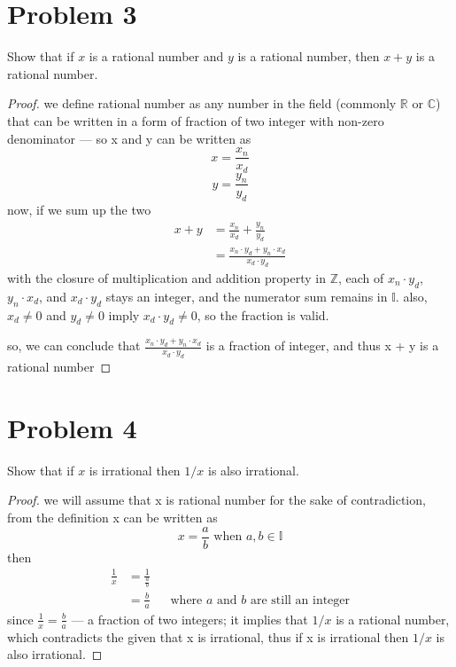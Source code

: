 \vspace{1em}
\hrulefill


\section*{Problem 3}
Show that if $x$ is a rational number and $y$ is a rational number, then $x + y$ is a rational number.

\medskip
\solution

 \begin{proof}
  we define rational number as any number in the field (commonly $
  \mathbb{R}$ or $\mathbb{C}$) that can be written in a form of
  fraction of two integer with non-zero denominator --- so x and y can
  be written as
  \[
  x = \frac{x_n}{x_d}
  \]
  \[
  y = \frac{y_n}{y_d}
  \]
  now, if we sum up the two
  \begin{align*}
  x + y &= \frac{x_n}{x_d} + \frac{y_n}{y_d}\\
  &= \frac{x_n \cdot y_d + y_n \cdot x_d}{x_d \cdot y_d}
  \end{align*}
  with the closure of multiplication and addition property in $
  \mathbb{Z}$, each of $x_n \cdot y_d$, $y_n \cdot x_d$, and $x_d \cdot
  y_d$ stays an integer, and the numerator sum remains in $\mathbb{I}$.
  also, $x_d \ne 0$ and $y_d \ne 0$ imply $x_d \cdot y_d \ne 0$, so the
  fraction is valid.

  so, we can conclude that $\frac{x_n \cdot y_d + y_n \cdot x_d}{x_d
  \cdot y_d}$ is a fraction of integer, and thus x + y is a rational
  number
  \end{proof}

\vspace{1em}
\hrulefill


\section*{Problem 4}
Show that if $x$ is irrational then $1/x$ is also irrational.

\medskip
\solution

 \begin{proof}
  we will assume that x is rational number for the sake of
  contradiction, from the definition x can be written as
  \[
      x = \frac{a}{b} \text{ when } a,b \in \mathbb{I}
  \]
  then
  \begin{align*}
      \frac{1}{x} &= \frac{1}{\frac{a}{b}}\\
  &= \frac{b}{a} && \text{where $a$ and $b$ are still an integer}
  \end{align*}
  since $\frac{1}{x} = \frac{b}{a}$ --- a fraction of two integers;
  it implies that $1/x$ is a rational number, which contradicts the
  given that x is irrational, thus if x is irrational then $1/x$ is
  also irrational.
  \end{proof}

